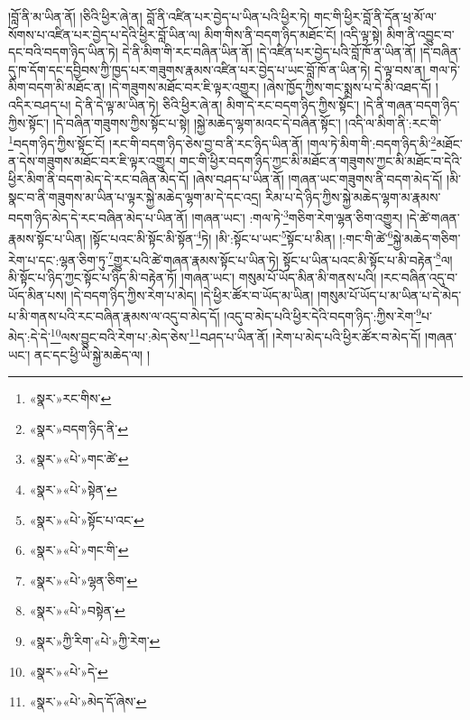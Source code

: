 །བློ་ནི་མ་ཡིན་ནོ། །ཅིའི་ཕྱིར་ཞེ་ན། བློ་ནི་འཛིན་པར་བྱེད་པ་ཡིན་པའི་ཕྱིར་ཏེ། གང་གི་ཕྱིར་བློ་ནི་དོན་ཕྲ་མོ་ལ་སོགས་པ་འཛིན་པར་བྱེད་པ་དེའི་ཕྱིར་བློ་ཡིན་ལ། མིག་གིས་ནི་བདག་ཉིད་མཐོང་ངོ། །འདི་ལྟ་སྟེ། མིག་ནི་འབྱུང་བ་དང་བའི་བདག་ཉིད་ཡིན་ཏེ། དེ་ནི་མིག་གི་རང་བཞིན་ཡིན་ནོ། །དེ་འཛིན་པར་བྱེད་པའི་བློ་ཁོ་ན་ཡིན་ནོ། །དེ་བཞིན་དུ་ཁ་དོག་དང་དབྱིབས་ཀྱི་ཁྱད་པར་གཟུགས་རྣམས་འཛིན་པར་བྱེད་པ་ཡང་བློ་ཁོ་ན་ཡིན་ཏེ། དེ་ལྟ་བས་ན། གལ་ཏེ་མིག་བདག་མི་མཐོང་ན། །དེ་གཟུགས་མཐོང་བར་ཇི་ལྟར་འགྱུར། །ཞེས་ཁྱོད་ཀྱིས་གང་སྨྲས་པ་དེ་མི་འཐད་དོ། །འདིར་བཤད་པ། དེ་ནི་དེ་ལྟ་མ་ཡིན་ཏེ། ཅིའི་ཕྱིར་ཞེ་ན། མིག་དེ་རང་བདག་ཉིད་ཀྱིས་སྟོང་། །དེ་ནི་གཞན་བདག་ཉིད་ཀྱིས་སྟོང་། །དེ་བཞིན་གཟུགས་ཀྱིས་སྟོང་པ་སྟེ། །སྐྱེ་མཆེད་ལྷག་མའང་དེ་བཞིན་སྟོང་། །འདི་ལ་མིག་ནི་:རང་གི་\footnote{«སྣར་»རང་གིས་}བདག་ཉིད་ཀྱིས་སྟོང་ངོ། །རང་གི་བདག་ཉིད་ཅེས་བྱ་བ་ནི་རང་ཉིད་ཡིན་ནོ། །གལ་ཏེ་མིག་གི་:བདག་ཉིད་མི་\footnote{«སྣར་»བདག་ཉིད་ནི་}མཐོང་ན་དེས་གཟུགས་མཐོང་བར་ཇི་ལྟར་འགྱུར། གང་གི་ཕྱིར་བདག་ཉིད་ཀྱང་མི་མཐོང་ན་གཟུགས་ཀྱང་མི་མཐོང་བ་དེའི་ཕྱིར་མིག་ནི་བདག་མེད་དེ་རང་བཞིན་མེད་དོ། །ཞེས་བཤད་པ་ཡིན་ནོ། །གཞན་ཡང་གཟུགས་ནི་བདག་མེད་དོ། །མི་སྣང་བ་ནི་གཟུགས་མ་ཡིན་པ་ལྟར་སྐྱེ་མཆེད་ལྷག་མ་དེ་དང་འདྲ། རིམ་པ་དེ་ཉིད་ཀྱིས་སྐྱེ་མཆེད་ལྷག་མ་རྣམས་བདག་ཉིད་མེད་དེ་རང་བཞིན་མེད་པ་ཡིན་ནོ། །གཞན་ཡང་། :གལ་ཏེ་\footnote{«སྣར་»«པེ་»གང་ཚེ་}གཅིག་རེག་ལྷན་ཅིག་འགྱུར། །དེ་ཚེ་གཞན་རྣམས་སྟོང་པ་ཡིན། །སྟོང་པའང་མི་སྟོང་མི་སྟོན་\footnote{«སྣར་»«པེ་»སྟེན་}ཏེ། །མི་:སྟོང་པ་ཡང་\footnote{«སྣར་»«པེ་»སྟོང་པ་འང་}སྟོང་པ་མིན། །:གང་གི་ཚེ་\footnote{«སྣར་»«པེ་»གང་གི་}སྐྱེ་མཆེད་གཅིག་རེག་པ་དང་:ལྷན་ཅིག་ཏུ་\footnote{«སྣར་»«པེ་»ལྷན་ཅིག་}གྱུར་པའི་ཚེ་གཞན་རྣམས་སྟོང་པ་ཡིན་ཏེ། སྟོང་པ་ཡིན་པའང་མི་སྟོང་པ་མི་བརྟེན་\footnote{«སྣར་»«པེ་»བསྟེན་}ལ། མི་སྟོང་པ་ཉིད་ཀྱང་སྟོང་པ་ཉིད་མི་བརྟེན་ཏོ། །གཞན་ཡང་། གསུམ་པོ་ཡོད་མིན་མི་གནས་པའི། །རང་བཞིན་འདུ་བ་ཡོད་མིན་པས། །དེ་བདག་ཉིད་ཀྱིས་རེག་པ་མེད། །དེ་ཕྱིར་ཚོར་བ་ཡོད་མ་ཡིན། །གསུམ་པོ་ཡོད་པ་མ་ཡིན་པ་དེ་མེད་པ་མི་གནས་པའི་རང་བཞིན་རྣམས་ལ་འདུ་བ་མེད་དོ། །འདུ་བ་མེད་པའི་ཕྱིར་དེའི་བདག་ཉིད་:ཀྱིས་རེག་\footnote{«སྣར་»ཀྱི་རིག་«པེ་»ཀྱི་རེག་}པ་མེད་:དེ་དེ་\footnote{«སྣར་»«པེ་»དེ་}ལས་བྱུང་བའི་རེག་པ་:མེད་ཅེས་\footnote{«སྣར་»«པེ་»མེད་དོ་ཞེས་}བཤད་པ་ཡིན་ནོ། །རེག་པ་མེད་པའི་ཕྱིར་ཚོར་བ་མེད་དོ། །གཞན་ཡང་། ནང་དང་ཕྱི་ཡི་སྐྱེ་མཆེད་ལ། །
